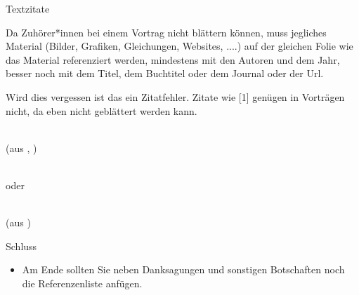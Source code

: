 \documentclass[aspectratio=169]{beamer}
\begin{document}
\begin{frame}{Textzitate}{ }


Da Zuh\"{o}rer*innen bei einem Vortrag nicht bl\"{a}ttern k\"{o}nnen, muss jegliches Material (Bilder, Grafiken, Gleichungen, Websites, ....) auf der gleichen Folie wie das Material referenziert werden, mindestens mit den Autoren und dem Jahr, besser noch mit dem Titel, dem Buchtitel oder dem Journal oder der Url.

Wird dies vergessen ist das ein Zitatfehler. Zitate wie [1] gen\"{u}gen in Vortr\"{a}gen nicht, da eben nicht gebl\"{a}ttert werden kann.

${}$\\

(aus \cite{Schoedel2002}, )

${}$\\

oder

${}$\\

(aus \cite{Das2003} )

\end{frame}

\begin{frame}{Schluss}{ }


    \begin{itemize}
    
    \item Am Ende sollten Sie neben Danksagungen und sonstigen Botschaften noch die Referenzenliste anf\"{u}gen.
    
    \end{itemize}



\end{frame}
\end{document}
